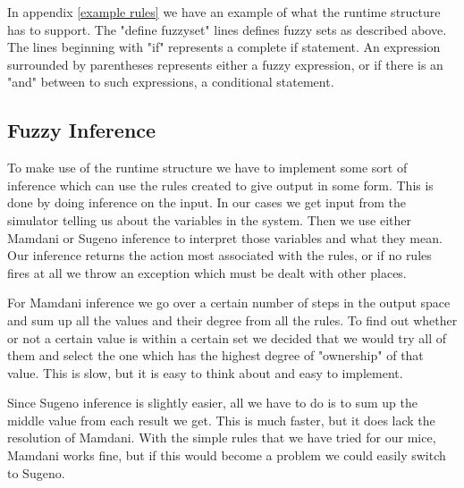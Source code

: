In appendix \ref{example rules} we have an example of what the runtime structure
has to support. The "define fuzzyset" lines defines fuzzy sets as described above.
The lines beginning with "if" represents a complete if statement. An expression
surrounded by parentheses represents either a fuzzy expression, or if there is an
"and" between to such expressions, a conditional statement.

\subsection{Fuzzy Inference}\label{fuzzy inference}
To make use of the runtime structure we have to implement some sort of inference
which can use the rules created to give output in some form. This is done by
doing inference on the input. In our cases we get input from the simulator
telling us about the variables in the system. Then we use either Mamdani or
Sugeno inference to interpret those variables and what they mean. Our inference
returns the action most associated with the rules, or if no rules fires at all
we throw an exception which must be dealt with other places.

For Mamdani inference we go over a certain number of steps in the output space
and sum up all the values and their degree from all the rules. To find out
whether or not a certain value is within a certain set we decided that we would
try all of them and select the one which has the highest degree of "ownership"
of that value. This is slow, but it is easy to think about and easy to implement.

Since Sugeno inference is slightly easier, all we have to do is to sum up the middle
value from each result we get. This is much faster, but it does lack the resolution
of Mamdani. With the simple rules that we have tried for our mice, Mamdani works
fine, but if this would become a problem we could easily switch to Sugeno.
